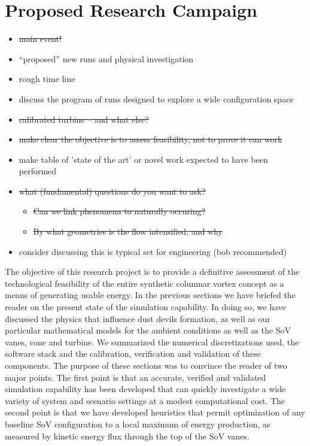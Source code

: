 \section{Proposed Research Campaign}
\label{sec:proposed_work}

\begin{itemize}
\item \st{main event!}
\item ``proposed'' new runs and physical investigation
\item rough time line
\item discuss the program of runs designed to explore a wide configuration space
\item \st{calibrated turbine -- and what else?}
\item \st{make clear the objective is to assess feasibility, not to prove it can work}
\item make table of 'state of the art' or novel work expected to have been performed
\item \st{what (fundamental) questions do you want to ask?}
  \begin{itemize}
  \item \st{Can we link phenomena to naturally occuring?}
  \item \st{By what geometries is the flow intensified, and why}
  \end{itemize}
  \item	consider discussing this is typical set for engineering (bob recommended)
\end{itemize}

The objective of this research project is to provide a definitive
assessment of the  
technological feasibility of the entire synthetic columnar vortex
concept as a means of generating usable energy. In the 
previous sections we have briefed the reader on the present state of the
simulation capability. In doing so, we have discussed the physics that
influence dust devils formation, as well as our particular mathematical
models for the ambient conditions as well as the SoV vanes, cone and
turbine. We summarized the numerical discretizations used, the software
stack and the calibration, verification and validation of these
components. The purpose of these sections was to convince the reader of
two major points. The first point is that an accurate, verified and
validated simulation capability has been developed that can quickly
investigate a wide variety of system and scenario settings at a modest
computational cost. The second point is that we have developed
heuristics that permit optimization of any baseline SoV configuration to
a local maximum of energy production, as measured by kinetic energy flux
through the top of the SoV vanes.  

